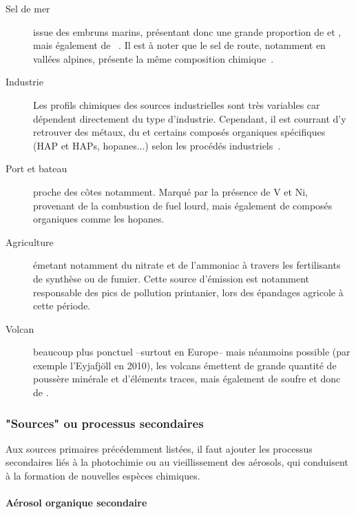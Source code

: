 \begin{description}
    \item[Sel de mer] issue des embruns marins, présentant donc une grande proportion de
         et , mais également de
        ~\autocite{belisCritical2013,odowdMarine1997,pioClimatology2007}. Il
        est à noter que le sel de route, notamment en vallées alpines, présente la même
        composition chimique~\autocite{airrhone-alpesInfluence2012}.

    \item[Industrie] Les profils chimiques des sources industrielles sont très variables
        car dépendent directement du type d'industrie. Cependant, il est courrant d'y
        retrouver des métaux, du \SOq et certains composés organiques spécifiques (HAP et
        HAPs, hopanes...) selon les procédés
        industriels~\autocite{sylvestreComprehensive2017}.

    \item[Port et bateau] proche des côtes notamment. Marqué par la présence de V et Ni,
        provenant de la combustion de fuel lourd, mais également de composés organiques
        comme les hopanes.

    \item[Agriculture] émetant notamment du nitrate et de l'ammoniac à travers les
        fertilisants de synthèse ou de fumier. Cette source d'émission est notamment
        responsable des pics de pollution printanier, lors des épandages agricole à cette
        période.

    \item[Volcan] beaucoup plus ponctuel --surtout en Europe-- mais néanmoins possible
        (par exemple l'Eyjafjöll en 2010), les volcans émettent de grande quantité de
        poussère minérale et d'éléments traces, mais également de soufre et donc de \SOq.

\end{description}

\subsubsection{"Sources" ou processus secondaires}%
\label{ssub:_sources_secondaires}

Aux sources primaires précédemment listées, il faut ajouter les processus secondaires liés
à la photochimie ou au vieillissement des aérosols, qui conduisent à la formation de
nouvelles espèces chimiques.

\paragraph{Aérosol organique secondaire}%
\label{par:aérosol_organique_secondaire}

